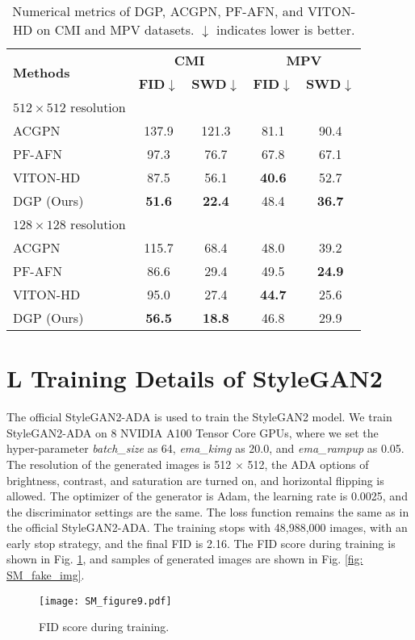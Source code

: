 \documentclass[10pt,twocolumn,letterpaper]{article}
\newcommand{\FID}{\textbf{FID$\downarrow$}}  \newcommand{\PPL}{\textbf{PPL$\downarrow$}}  \newcommand{\SSIM}{\textbf{SSIM$\downarrow$}}  \newcommand{\SWD}{\textbf{SWD$\downarrow$}}
\begin{document}
\begin{table}[!h]
\caption{
    Numerical metrics of DGP, ACGPN, PF-AFN, and VITON-HD on CMI and MPV datasets. $\downarrow$ indicates lower is better.
  }
  \label{tab:different_resolution}
  \centering
  \begin{tabular}{lcccc}
		\toprule
		\multirow{2}{*}{\textbf{Methods}} & \multicolumn{2}{c}{\textbf{CMI}} & \multicolumn{2}{c}{\textbf{MPV}} \\
		 \cmidrule(lr){2-3}\cmidrule(lr){4-5}& \FID & \SWD & \FID & \SWD\\
		\midrule
		$512\times512$ resolution & & & &\\
		\cmidrule(lr){1-1}ACGPN&137.9 &121.3&81.1 &90.4\\
		PF-AFN &97.3&76.7&67.8&67.1\\
		VITON-HD &87.5&56.1&\textbf{40.6}&52.7\\
		DGP (Ours) &\textbf{51.6}&\textbf{22.4}&48.4&\textbf{36.7}\\
		\midrule
		$128\times128$ resolution & & & &\\
	
		\cmidrule(lr){1-1}ACGPN&115.7 &68.4&48.0 &39.2\\
		PF-AFN &86.6&29.4&49.5&\textbf{24.9}\\
		VITON-HD &95.0&27.4&\textbf{44.7}&25.6\\
		DGP (Ours) &\textbf{56.5}&\textbf{18.8}&46.8&29.9\\
		\bottomrule
	\end{tabular} 
\end{table}


\section*{L Training Details of StyleGAN2}

The official StyleGAN2-ADA \cite{karras2020training} is used to train the StyleGAN2 model. We train StyleGAN2-ADA on 8 NVIDIA A100 Tensor Core GPUs, where we set the hyper-parameter \textit{batch\_size} as 64, \textit{ema\_kimg} as 20.0, and \textit{ema\_rampup} as 0.05. The resolution of the generated images is 512 $\times$ 512, the ADA options of brightness, contrast, and saturation are turned on, and horizontal flipping is allowed. The optimizer of the generator is Adam, the learning rate is 0.0025, and the discriminator settings are the same. The loss function remains the same as in the official StyleGAN2-ADA. The training stops with 48,988,000 images, with an early stop strategy, and the final FID is 2.16. The FID score during training is shown in Fig. \ref{fig: stylegan_fid}, and samples of generated images are shown in Fig. \ref{fig: SM_fake_img}.
\begin{figure}[t]
  \centering
  \texttt{[image: SM\_figure9.pdf]}
  \caption{FID score during training.}\label{fig: stylegan_fid}
\end{figure}
\end{document}
